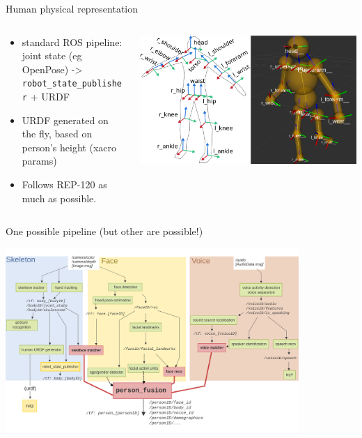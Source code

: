 \documentclass[xcolor=table]{beamer}
\begin{document}
\begin{frame}{Human physical representation}

    \begin{columns}
        \begin{column}{0.4\linewidth}
            \begin{itemize}
                \item standard ROS pipeline: joint state (eg OpenPose) -> \texttt{robot\_state\_publisher} + URDF

                \item URDF generated on the fly, based on person’s height (xacro params)

                \item Follows REP-120 as much as possible.
            \end{itemize}
        \end{column}
        \begin{column}{0.6\linewidth}
            \begin{center}
                \includegraphics[width=\linewidth]{ros4hri/skeletons}
            \end{center}
        \end{column}
    \end{columns}
\end{frame}

\begin{frame}{One possible pipeline (but other are possible!)}
    \begin{center}
        \includegraphics[height=7cm]{ros4hri/ros4hri-pipeline2}
    \end{center}
\end{frame}
\end{document}
